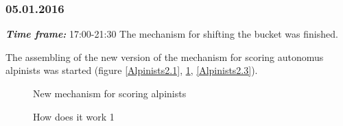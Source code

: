 \subsubsection{05.01.2016}
\textit{\textbf{Time frame:}} 17:00-21:30 \newline
The mechanism for shifting the bucket was finished.

The assembling of the new version of the mechanism for scoring autonomus alpinists was started (figure \ref{Alpinists2.1}, \ref{Alpinists2.2}, \ref{Alpinists2.3}).

\begin{figure}[H]
	\begin{minipage}[h]{0.31\linewidth}
		\caption{New mechanism for scoring alpinists}
		\label{Alpinists2.1}
	\end{minipage}
	\hfill
	\begin{minipage}[h]{0.31\linewidth}
		\caption{How does it work 1}
		\label{Alpinists2.2}
	\end{minipage}
	\hfill
	\begin{minipage}[h]{0.31\linewidth}

\end{minipage}
\end{figure}
